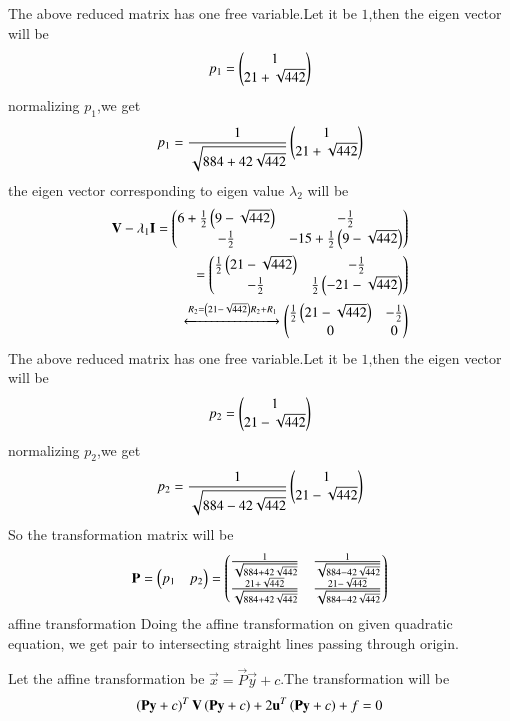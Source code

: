 The above reduced matrix has one free variable.Let it be $1$,then the eigen vector will be
\begin{align}
    {p_1}=\begin{pmatrix}1\\21+\sqrt{442}\end{pmatrix}
\end{align}
normalizing $p_1$,we get
\begin{align}
    p_1=\frac{1}{\sqrt{884+42\sqrt{442}}}\begin{pmatrix}1\\21+\sqrt{442}\end{pmatrix}
\end{align}
the eigen vector corresponding to eigen value $\lambda_2$ will be
\begin{align}
    \mathbf{V}-\lambda_1\mathbf{I}=\begin{pmatrix}6+\frac{1}{2}\left(9-\sqrt{442}\right)&-\frac{1}{2}\\-\frac{1}{2}&-15+\frac{1}{2}\left(9-\sqrt{442}\right)\end{pmatrix}\\
    =\begin{pmatrix}\frac{1}{2}\left(21-\sqrt{442}\right)&-\frac{1}{2}\\-\frac{1}{2}&\frac{1}{2}\left(-21-\sqrt{442}\right)\end{pmatrix}\\
    \xleftrightarrow[]{R_2=\ensuremath{\left(21-\sqrt{442}\right)}R_2+R_1}\begin{pmatrix}\frac{1}{2}\left(21-\sqrt{442}\right)&-\frac{1}{2}\\0&0\end{pmatrix}
\end{align}
The above reduced matrix has one free variable.Let it be $1$,then the eigen vector will be
\begin{align}
    {p_2}=\begin{pmatrix}1\\21-\sqrt{442}\end{pmatrix}
\end{align}
normalizing $p_2$,we get
\begin{align}
    p_2=\frac{1}{\sqrt{884-42\sqrt{442}}}\begin{pmatrix}1\\21-\sqrt{442}\end{pmatrix}
\end{align}
So the transformation matrix will be 
\begin{align}
    \mathbf{P}=\begin{pmatrix}p_1&p_2\end{pmatrix}=\begin{pmatrix}\frac{1}{\sqrt{884+42\sqrt{442}}}&\frac{1}{\sqrt{884-42\sqrt{442}}}\\\frac{21+\sqrt{442}}{\sqrt{884+42\sqrt{442}}}&\frac{21-\sqrt{442}}{\sqrt{884-42\sqrt{442}}}\end{pmatrix}
\end{align}
{affine transformation}
Doing the affine transformation on given quadratic equation, we get pair to intersecting straight lines passing through origin.\par
Let the affine transformation be $\vec{x}=\vec{P}\vec{y}+c$.The transformation will be
\begin{align}
    \left(\mathbf{P}\mathbf{y}+c\right)^T\mathbf{V}\left(\mathbf{P}\mathbf{y}+c\right)+2\mathbf{u}^T\left(\mathbf{P}\mathbf{y}+c\right)+f=0\\
\end{align}
